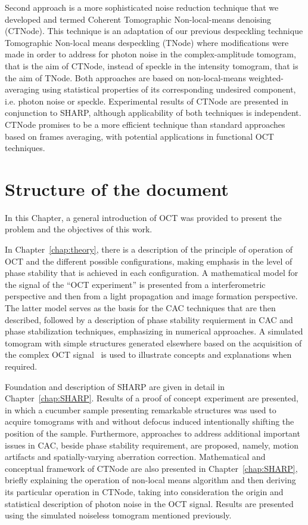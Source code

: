 Second approach is a more sophisticated noise reduction technique that we developed and termed Coherent Tomographic Non-local-means denoising (CTNode). This technique is an adaptation of our previous despeckling technique Tomographic Non-local means despeckling (TNode) where modifications were made in order to address for photon noise in the complex-amplitude tomogram, that is the aim of CTNode, instead of speckle in the intensity tomogram, that is the aim of TNode. Both approaches are based on non-local-means weighted-averaging using statistical properties of its corresponding undesired component, i.e. photon noise or speckle. Experimental results of CTNode are presented in conjunction to SHARP, although applicability of both techniques is independent. CTNode promises to be a more efficient technique than standard approaches based on frames averaging, with potential applications in functional OCT techniques.

\section{Structure of the document}

In this Chapter, a general introduction of OCT was provided to present the problem and the objectives of this work.

In Chapter~\ref{chap:theory}, there is a description of the principle of operation of OCT and the different possible configurations, making emphasis in the level of phase stability that is achieved in each configuration. A mathematical model for the signal of the ``OCT experiment'' is presented from a interferometric perspective and then from a light propagation and image formation perspective. The latter model serves as the basis for the CAC techniques that are then described, followed by a description of phase stability requierment in CAC and phase stabilization techniques, emphasizing in numerical approaches. A simulated tomogram with simple structures generated elsewhere based on the acquisition of the complex OCT signal~\cite{Cuartas-Velez2017_Formacion} is used to illustrate concepts and explanations when required.

Foundation and description of SHARP are given in detail in Chapter~\ref{chap:SHARP}. Results of a proof of concept experiment are presented, in which a cucumber sample presenting remarkable structures was used to acquire tomograms with and without defocus induced intentionally shifting the position of the sample. Furthermore, approaches to address additional important issues in CAC, beside phase stability requirement, are proposed, namely, motion artifacts and spatially-varying aberration correction. Mathematical and conceptual framework of CTNode are also presented in Chapter~\ref{chap:SHARP}, briefly explaining the operation of non-local means algorithm and then deriving its particular operation in CTNode, taking into consideration the origin and statistical description of photon noise in the OCT signal. Results are presented using the simulated noiseless tomogram mentioned previously.

